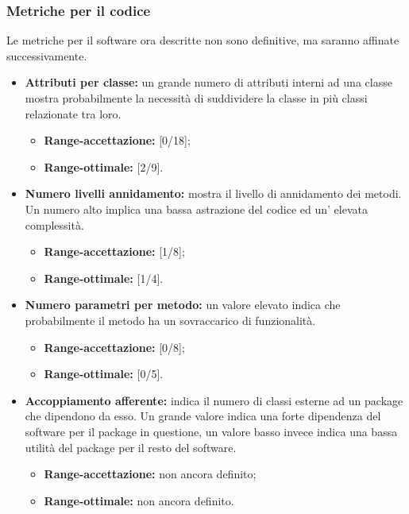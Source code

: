 		
		\subsubsection{Metriche per il codice}
		Le metriche per il software ora descritte non sono definitive, ma saranno affinate successivamente.
		
		\begin{itemize}
			\item \textbf{Attributi per classe: }un grande numero di attributi interni ad una classe mostra probabilmente la necessità di suddividere la classe in più classi relazionate tra loro.
			
			\begin{itemize}
				\item \textbf{Range-accettazione: }[0/18];
				\item \textbf{Range-ottimale: }[2/9].
			\end{itemize}
		
			\item \textbf{Numero livelli annidamento: }mostra il livello di annidamento dei metodi. Un numero alto implica una bassa astrazione del codice ed un' elevata complessità.
			
			\begin{itemize}
				\item \textbf{Range-accettazione: }[1/8];
				\item \textbf{Range-ottimale: }[1/4].
			\end{itemize}
			
			\item \textbf{Numero parametri per metodo: }un valore elevato indica che probabilmente il metodo ha un sovraccarico di funzionalità.
			
			\begin{itemize}
				\item \textbf{Range-accettazione: }[0/8];
				\item \textbf{Range-ottimale: }[0/5].
			\end{itemize}
			
			\item \textbf{Accoppiamento afferente: }indica il numero di classi esterne ad un package che dipendono da esso. Un grande valore indica una forte dipendenza del software per il package in questione, un valore basso invece indica una bassa utilità del package per il resto del software.
			
			\begin{itemize}
				\item \textbf{Range-accettazione: }non ancora definito;
				\item \textbf{Range-ottimale: }non ancora definito.
			\end{itemize}
			

\end{itemize}
